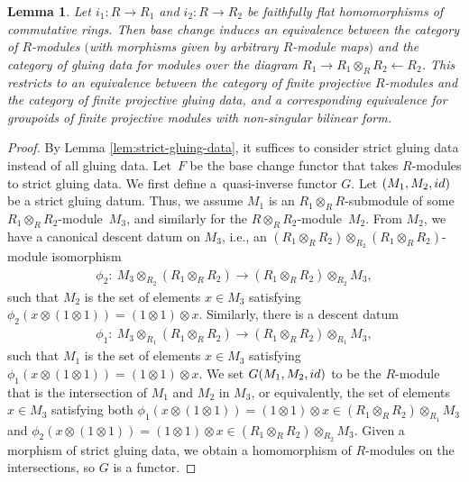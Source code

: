 \documentclass[11pt]{article}
\newtheorem{lem}[thm]{Lemma}
\theoremstyle{definition}
\begin{document}
\begin{lem} \label{lem:faithfully-flat-gluing-data-for-flat-modules}Let $i_1\colon R \to R_1$ and $i_2\colon R \to R_2$ be faithfully flat homomorphisms of commutative rings. Then base change induces an equivalence between the category of $R$-modules $($with morphisms given by arbitrary $R$-module maps$)$ and the category of gluing data for modules over the diagram $R_1 \to R_1 \otimes_{R} R_2 \leftarrow R_2$. This restricts to an equivalence between the category of finite projective $R$-modules and the category of finite projective gluing data, and a corresponding equivalence for groupoids of finite projective modules with non-singular bilinear form.
\end{lem}
\begin{proof}By Lemma \ref{lem:strict-gluing-data}, it suffices to consider strict gluing data instead of all gluing data. Let~$F$ be the base change functor that takes $R$-modules to strict gluing data. We first define a~quasi-inverse functor $G$. Let $(M_1, M_2, {\rm id})$ be a strict gluing datum. Thus, we assume $M_1$ is an $R_1 \otimes_{R} R$-submodule of some $R_1 \otimes_{R} R_2$-module~$M_3$, and similarly for the $R \otimes_{R} R_2$-module~$M_2$. From $M_2$, we have a canonical descent datum on $M_3$, i.e., an $(R_1 \otimes_{R} R_2) \otimes_{R_2} (R_1 \otimes_{R} R_2)$-module isomorphism
\begin{gather*} \phi_2\colon \ M_3 \otimes_{R_2}(R_1 \otimes_{R} R_2) \to (R_1 \otimes_{R} R_2) \otimes_{R_2} M_3, \end{gather*}
such that $M_2$ is the set of elements $x \in M_3$ satisfying $\phi_2(x \otimes (1 \otimes 1)) = (1 \otimes 1) \otimes x$. Similarly, there is a descent datum
\begin{gather*} \phi_1\colon \ M_3 \otimes_{R_1}(R_1 \otimes_{R} R_2) \to (R_1 \otimes_{R} R_2) \otimes_{R_1} M_3, \end{gather*}
such that $M_1$ is the set of elements $x \in M_3$ satisfying $\phi_1(x \otimes (1 \otimes 1)) = (1 \otimes 1) \otimes x$. We set $G(M_1, M_2,{\rm id})$ to be the $R$-module that is the intersection of $M_1$ and $M_2$ in $M_3$, or equivalently, the set of elements $x \in M_3$ satisfying both $\phi_1(x \otimes (1 \otimes 1)) = (1 \otimes 1) \otimes x \in (R_1 \otimes_{R} R_2) \otimes_{R_1} M_3$ and $\phi_2(x \otimes (1 \otimes 1)) = (1 \otimes 1) \otimes x \in (R_1 \otimes_{R} R_2) \otimes_{R_2} M_3$. Given a morphism of strict gluing data, we obtain a homomorphism of $R$-modules on the intersections, so $G$ is a functor.


\end{proof}
\end{document}
